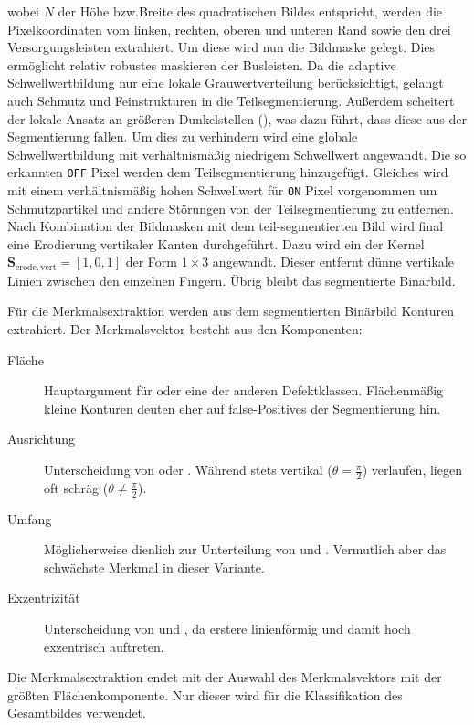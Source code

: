 wobei \(N\) der Höhe bzw.\@ Breite des quadratischen Bildes entspricht, werden die Pixelkoordinaten vom linken, rechten, oberen und unteren Rand sowie den drei Versorgungsleisten extrahiert. Um diese wird nun die Bildmaske gelegt. Dies ermöglicht relativ robustes maskieren der Busleisten. Da die adaptive Schwellwertbildung nur eine lokale Grauwertverteilung berücksichtigt, gelangt auch Schmutz und Feinstrukturen in die Teilsegmentierung. Außerdem scheitert der lokale Ansatz an größeren Dunkelstellen (), was dazu führt, dass diese aus der Segmentierung fallen. Um dies zu verhindern wird eine globale Schwellwertbildung mit verhältnismäßig niedrigem Schwellwert angewandt. Die so erkannten \texttt{\foreignlanguage{english}{OFF}} Pixel werden dem Teilsegmentierung hinzugefügt. Gleiches wird mit einem verhältnismäßig hohen Schwellwert für \texttt{\foreignlanguage{english}{ON}} Pixel vorgenommen um Schmutzpartikel und andere Störungen von der Teilsegmentierung zu entfernen. Nach Kombination der Bildmasken mit dem teil-segmentierten Bild wird final eine Erodierung vertikaler Kanten durchgeführt. Dazu wird ein der Kernel \(\boldsymbol{S}_{\mathrm{erode},\mathrm{vert}} = {\left[ 1, 0, 1 \right]}\) der Form \(1 \times 3\) angewandt. Dieser entfernt dünne vertikale Linien zwischen den einzelnen Fingern. Übrig bleibt das segmentierte Binärbild.

Für die Merkmalsextraktion werden aus dem segmentierten Binärbild Konturen extrahiert. Der Merkmalsvektor besteht aus den Komponenten:
%
\begin{description}
    \item[Fläche] Hauptargument für  oder eine der anderen Defektklassen. Flächenmäßig kleine Konturen deuten eher auf \foreignlanguage{english}{false-Positives} der Segmentierung hin.
    \item[Ausrichtung] Unterscheidung von  oder . Während stets vertikal (\(\theta = \frac{\pi}{2}\)) verlaufen, liegen  oft schräg (\(\theta \neq \frac{\pi}{2}\)).
    \item[Umfang] Möglicherweise dienlich zur Unterteilung von  und . Vermutlich aber das schwächste Merkmal in dieser Variante.
    \item[Exzentrizität] Unterscheidung von  und , da erstere linienförmig und damit hoch exzentrisch auftreten.
\end{description}

Die Merkmalsextraktion endet mit der Auswahl des Merkmalsvektors mit der größten Flächenkomponente. Nur dieser wird für die Klassifikation des Gesamtbildes verwendet.

